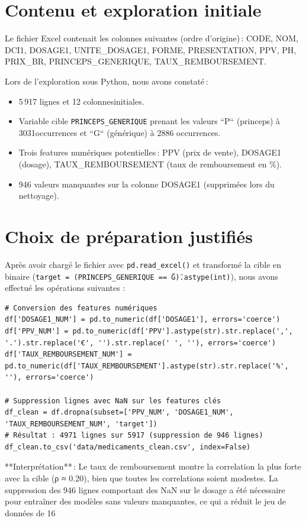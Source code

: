\documentclass[12pt,a4paper]{report}
\begin{document}
\section{Contenu et exploration initiale}
Le fichier Excel contenait les colonnes suivantes (ordre d'origine) : CODE, NOM, DCI1, DOSAGE1, UNITE_DOSAGE1, FORME, PRESENTATION, PPV, PH, PRIX_BR, PRINCEPS_GENERIQUE, TAUX_REMBOURSEMENT. 

Lors de l'exploration sous Python, nous avons constaté :
\begin{itemize}
    \item 5 917 lignes et 12 colonnesinitiales.
    \item Variable cible \texttt{PRINCEPS_GENERIQUE} prenant les valeurs ``P`` (princeps) à 3031occurrences et ``G`` (générique) à 2886 occurrences.
    \item Trois features numériques potentielles : PPV (prix de vente), DOSAGE1 (dosage), TAUX_REMBOURSEMENT (taux de remboursement en \%).
    \item 946 valeurs manquantes sur la colonne DOSAGE1 (supprimées lors du nettoyage).
\end{itemize}

\section{Choix de préparation justifiés}
Après avoir chargé le fichier avec \texttt{pd.read\_excel()} et transformé la cible en binaire (\texttt{target = (PRINCEPS_GENERIQUE == \"G\").astype(int)}), nous avons effectué les opérations suivantes :

\begin{verbatim}
# Conversion des features numériques
df['DOSAGE1_NUM'] = pd.to_numeric(df['DOSAGE1'], errors='coerce')
df['PPV_NUM'] = pd.to_numeric(df['PPV'].astype(str).str.replace(',', '.').str.replace('€', '').str.replace(' ', ''), errors='coerce')
df['TAUX_REMBOURSEMENT_NUM'] = pd.to_numeric(df['TAUX_REMBOURSEMENT'].astype(str).str.replace('%', ''), errors='coerce')

# Suppression lignes avec NaN sur les features clés
df_clean = df.dropna(subset=['PPV_NUM', 'DOSAGE1_NUM', 'TAUX_REMBOURSEMENT_NUM', 'target'])
# Résultat : 4971 lignes sur 5917 (suppression de 946 lignes)
df_clean.to_csv('data/medicaments_clean.csv', index=False)
\end{verbatim}

**Interprétation** : Le taux de remboursement montre la correlation la plus forte avec la cible (ρ ≈ 0.20), bien que toutes les correlations soient modestes. La suppression des 946 lignes comportant des NaN sur le dosage a été nécessaire pour entraîner des modèles sans valeurs manquantes, ce qui a réduit le jeu de données de 16 %
\end{document}
